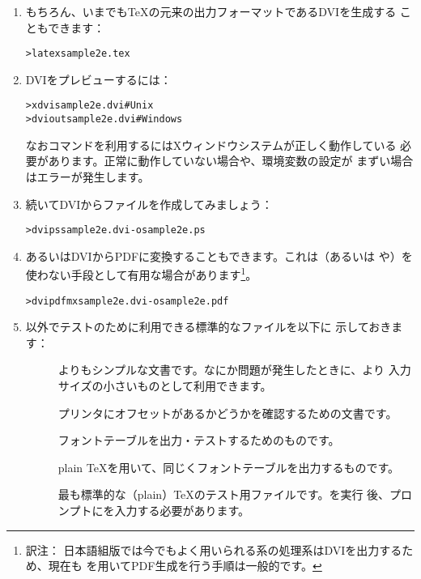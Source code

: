 \documentclass[uplatex,dvipdfmx,12pt,tombow]{jsarticle}
\begin{document}
\begin{enumerate}
\item もちろん、いまでも\TeX の元来の出力フォーマットであるDVIを生成する
こともできます：
%
\begin{alltt}
> latex sample2e.tex
\end{alltt}

\item DVIをプレビューするには：
%
\begin{alltt}
> xdvi sample2e.dvi    # Unix
> dviout sample2e.dvi  # Windows
\end{alltt}
%
なおコマンドを利用するにはXウィンドウシステムが正しく動作している
必要があります。正常に動作していない場合や、環境変数の設定が
まずい場合はエラーが発生します。

\item 続いてDVIから\PS ファイルを作成してみましょう：
%
\begin{alltt}
> dvips sample2e.dvi -o sample2e.ps
\end{alltt}

\item あるいはDVIからPDFに変換することもできます。これは\pdfTeX （あるいは
\XeTeX や\LuaTeX）を使わない手段として有用な場合があります\footnote{訳注：
日本語組版では今でもよく用いられる\pTeX 系の処理系はDVIを出力するため、現在も
を用いてPDF生成を行う手順は一般的です。}。
%
\begin{alltt}
> dvipdfmx sample2e.dvi -o sample2e.pdf
\end{alltt}

\item {}以外でテストのために利用できる標準的なファイルを以下に
示しておきます：
%
\begin{description}
\item []
よりもシンプルな文書です。なにか問題が発生したときに、より
入力サイズの小さいものとして利用できます。

\item []
プリンタにオフセットがあるかどうかを確認するための文書です。

\item []
フォントテーブルを出力・テストするためのものです。

\item []
plain \TeX を用いて、同じくフォントテーブルを出力するものです。

\item []
最も標準的な（plain）\TeX のテスト用ファイルです。を実行
後、\code{*}プロンプトにを入力する必要があります。
\end{description}


\end{enumerate}
\end{document}
